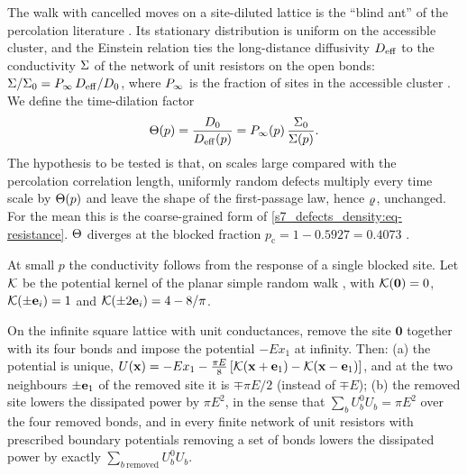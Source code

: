 The walk with cancelled moves on a site-diluted lattice is the ``blind ant'' of the percolation literature
\citep{HavlinBenAvraham1987}. Its stationary distribution is uniform on the accessible cluster, and the Einstein relation
ties the long-distance diffusivity $D_{\mathrm{eff}}$ to the conductivity $\Sigma$ of the network of unit resistors on the open
bonds: $\Sigma/\Sigma_{0}=P_{\infty}\,D_{\mathrm{eff}}/D_{0}$, where $P_{\infty}$ is the fraction of sites in the accessible cluster
\citep{HavlinBenAvraham1987,StaufferAharony1994}. We define the time-dilation factor
\begin{equation}\label{s7_defects_density:eq-theta}
  \Theta(p)=\frac{D_{0}}{D_{\mathrm{eff}}(p)}=P_{\infty}(p)\,\frac{\Sigma_{0}}{\Sigma(p)} .
\end{equation}
The hypothesis to be tested is that, on scales large compared with the percolation correlation length, uniformly random
defects multiply every time scale by $\Theta(p)$ and leave the shape of the first-passage law, hence $\varrho$, unchanged.
For the mean this is the coarse-grained form of \eqref{s7_defects_density:eq-resistance}. $\Theta$ diverges at the blocked
fraction $p_{\mathrm c}=1-0.5927=0.4073$ \citep{NewmanZiff2000}.

At small $p$ the conductivity follows from the response of a single blocked site. Let $\mathcal{K}$ be the potential kernel of
the planar simple random walk \citep{Spitzer1976}, with $\mathcal{K}(\mathbf 0)=0$, $\mathcal{K}(\pm\mathbf{e}_i)=1$ and $\mathcal{K}(\pm2\mathbf{e}_i)=4-8/\pi$.

\begin{proposition}\label{s7_defects_density:prop-dilute}
On the infinite square lattice with unit conductances, remove the site $\mathbf 0$ together with its four bonds and
impose the potential $-E x_1$ at infinity. Then:
(a) the potential is unique, $U(\mathbf{x})=-Ex_1-\frac{\pi E}{8}\,[\mathcal{K}(\mathbf{x}+\mathbf{e}_1)-\mathcal{K}(\mathbf{x}-\mathbf{e}_1)]$, and at the two neighbours
$\pm\mathbf{e}_1$ of the removed site it is $\mp\pi E/2$ (instead of $\mp E$);
(b) the removed site lowers the dissipated power by $\pi E^{2}$, in the sense that $\sum_{b}U^{0}_{b}U_{b}=\pi E^{2}$ over
the four removed bonds, and in every finite network of unit resistors with prescribed boundary potentials removing a
set of bonds lowers the dissipated power by exactly $\sum_{b\ \mathrm{removed}}U^{0}_{b}U_{b}$.
\end{proposition}

